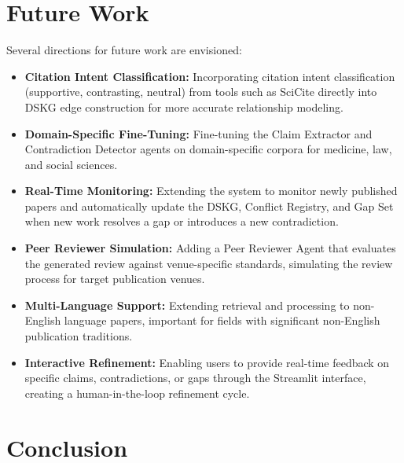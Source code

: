\section{Future Work}

Several directions for future work are envisioned:

\begin{itemize}
    \item \textbf{Citation Intent Classification:} Incorporating citation intent classification (supportive, contrasting, neutral) from tools such as SciCite directly into DSKG edge construction for more accurate relationship modeling.

    \item \textbf{Domain-Specific Fine-Tuning:} Fine-tuning the Claim Extractor and Contradiction Detector agents on domain-specific corpora for medicine, law, and social sciences.

    \item \textbf{Real-Time Monitoring:} Extending the system to monitor newly published papers and automatically update the DSKG, Conflict Registry, and Gap Set when new work resolves a gap or introduces a new contradiction.

    \item \textbf{Peer Reviewer Simulation:} Adding a Peer Reviewer Agent that evaluates the generated review against venue-specific standards, simulating the review process for target publication venues.

    \item \textbf{Multi-Language Support:} Extending retrieval and processing to non-English language papers, important for fields with significant non-English publication traditions.

    \item \textbf{Interactive Refinement:} Enabling users to provide real-time feedback on specific claims, contradictions, or gaps through the Streamlit interface, creating a human-in-the-loop refinement cycle.
\end{itemize}

\section{Conclusion}

